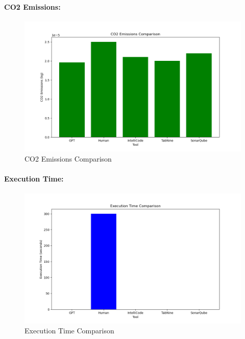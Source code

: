 \documentclass[conference,compsoc]{IEEEtran}
\begin{document}
\paragraph{CO2 Emissions:}
\begin{figure}[H]
	\centering
	\includegraphics[width=0.8\linewidth]{figures/co2_emissions_comparison.png}
	\caption{CO2 Emissions Comparison}
	\label{fig:co2_emissions_comparison}
\end{figure}

\paragraph{Execution Time:}
\begin{figure}[H]
	\centering
	\includegraphics[width=0.8\linewidth]{figures/execution_time_comparison.png}
	\caption{Execution Time Comparison}
	\label{fig:execution_time_comparison}
\end{figure}
\end{document}
